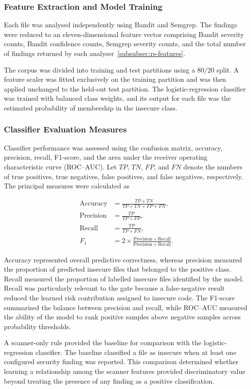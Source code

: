 \subsubsection{Feature Extraction and Model Training}
\label{subsubsec:evaluation-model-training}

Each file was analysed independently using Bandit and Semgrep. The findings were reduced
to an eleven-dimensional feature vector comprising Bandit severity counts, Bandit
confidence counts, Semgrep severity counts, and the total number of findings returned by
each analyser~\ref{subsubsec:rs-features}.

The corpus was divided into training and test partitions using a $80/20$
split. A feature scaler was fitted exclusively on the training partition and was then applied unchanged
to the held-out test partition. The logistic-regression classifier was trained with
balanced class weights, and its output for each file was the estimated probability of
membership in the insecure class.

\subsubsection{Classifier Evaluation Measures}
\label{subsubsec:evaluation-classifier-measures}

Classifier performance was assessed using the confusion matrix, accuracy, precision,
recall, F1-score, and the area under the receiver operating characteristic curve
(ROC--AUC). Let $TP$, $TN$, $FP$, and $FN$ denote the numbers of true positives, true
negatives, false positives, and false negatives, respectively. The principal measures
were calculated as

\begin{align}
\mathrm{Accuracy} &= \frac{TP+TN}{TP+TN+FP+FN},
\label{eq:evaluation-accuracy} \\
\mathrm{Precision} &= \frac{TP}{TP+FP},
\label{eq:evaluation-precision} \\
\mathrm{Recall} &= \frac{TP}{TP+FN},
\label{eq:evaluation-recall} \\
F_1 &= 2 \times
\frac{\mathrm{Precision}\times\mathrm{Recall}}
{\mathrm{Precision}+\mathrm{Recall}}.
\label{eq:evaluation-f1}
\end{align}

Accuracy represented overall predictive correctness, whereas precision measured the
proportion of predicted insecure files that belonged to the positive class. Recall
measured the proportion of labelled insecure files identified by the model. Recall was
particularly relevant to the gate because a false-negative result reduced the learned
risk contribution assigned to insecure code. The F1-score summarised the balance between
precision and recall, while ROC--AUC measured the ability of the model to rank positive
samples above negative samples across probability thresholds.

A scanner-only rule provided the baseline for comparison with the logistic-regression
classifier. The baseline classified a file as insecure when at least one configured
security finding was reported. This comparison determined whether learning a relationship
among the scanner features provided discriminatory value beyond treating the presence of
any finding as a positive classification.